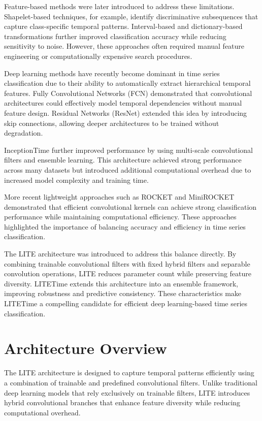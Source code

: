 \documentclass[conference]{IEEEtran}
\begin{document}
Feature-based methods were later introduced to address these limitations. Shapelet-based techniques, for example, identify discriminative subsequences that capture class-specific temporal patterns. Interval-based and dictionary-based transformations further improved classification accuracy while reducing sensitivity to noise. However, these approaches often required manual feature engineering or computationally expensive search procedures.

Deep learning methods have recently become dominant in time series classification due to their ability to automatically extract hierarchical temporal features. Fully Convolutional Networks (FCN) demonstrated that convolutional architectures could effectively model temporal dependencies without manual feature design. Residual Networks (ResNet) extended this idea by introducing skip connections, allowing deeper architectures to be trained without degradation.

InceptionTime further improved performance by using multi-scale convolutional filters and ensemble learning. This architecture achieved strong performance across many datasets but introduced additional computational overhead due to increased model complexity and training time.

More recent lightweight approaches such as ROCKET and MiniROCKET demonstrated that efficient convolutional kernels can achieve strong classification performance while maintaining computational efficiency. These approaches highlighted the importance of balancing accuracy and efficiency in time series classification.

The LITE architecture was introduced to address this balance directly. By combining trainable convolutional filters with fixed hybrid filters and separable convolution operations, LITE reduces parameter count while preserving feature diversity. LITETime extends this architecture into an ensemble framework, improving robustness and predictive consistency. These characteristics make LITETime a compelling candidate for efficient deep learning-based time series classification.


\section{Architecture Overview}

The LITE architecture is designed to capture temporal patterns efficiently using a combination of trainable and predefined convolutional filters. Unlike traditional deep learning models that rely exclusively on trainable filters, LITE introduces hybrid convolutional branches that enhance feature diversity while reducing computational overhead.
\end{document}
